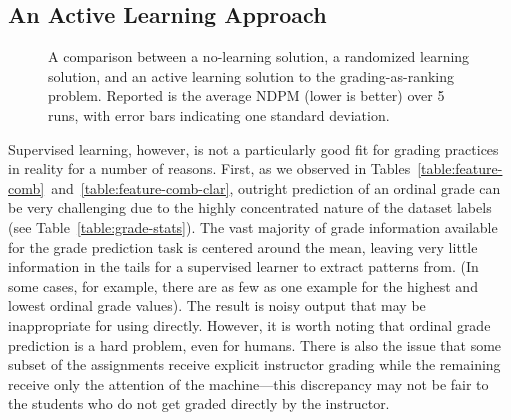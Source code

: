 \subsection{An Active Learning Approach}

\begin{figure}
  \begin{center}
  \caption{A comparison between a no-learning solution, a randomized
  learning solution, and an active learning solution to the
  grading-as-ranking problem. Reported is the average NDPM (lower is
  better) over 5 runs, with error bars indicating one standard deviation.}
  \label{fig:active-learning}
  \end{center}
\end{figure}

Supervised learning, however, is not a particularly good fit for grading
practices in reality for a number of reasons. First, as we observed in
Tables~\ref{table:feature-comb}~and~\ref{table:feature-comb-clar}, outright
prediction of an ordinal grade can be very challenging due to the highly
concentrated nature of the dataset labels (see
Table~\ref{table:grade-stats}). The vast majority of grade information
available for the grade prediction task is centered around the mean,
leaving very little information in the tails for a supervised learner to
extract patterns from. (In some cases, for example, there are as few as one
example for the highest and lowest ordinal grade values). The result is
noisy output that may be inappropriate for using directly. However, it is
worth noting that ordinal grade prediction is a hard problem, even for
humans. There is also
the issue that some subset of the assignments receive explicit instructor
grading while the remaining receive only the attention of the
machine---this discrepancy may not be fair to the students who do not get
graded directly by the instructor.

